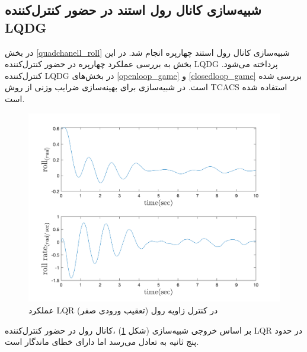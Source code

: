 \subsection{شبیه‌سازی کانال رول استند در حضور کنترل‌کننده LQDG}
در بخش
\ref{quadchanell_roll}
شبیه‌سازی کانال رول استند چهارپره انجام شد. در این بخش به بررسی عملکرد چهارپره در حضور کنترل‌کننده LQDG پرداخته می‌شود. کنترل‌کننده LQDG در بخش‌های
\ref{openloop_game}
و
\ref{closedloop_game}
بررسی شده است.
 در شبیه‌سازی برای بهینه‌سازی ضرایب وزنی از روش
TCACS \cite{Karimi2010}
استفاده شده است.
\begin{figure}[H]\label{lqr_roll_fig}
	\includegraphics[width=12cm]{../Figures/MIL/LQR/Roll/lqr_roll.png}
	\centering
	\caption{عملكرد LQR در کنترل زاويه رول (تعقیب ورودی صفر)}
\end{figure}
بر اساس خروجی شبیه‌سازی (شکل
\ref{lqr_roll_fig})
،کانال رول در حضور کنترل‌کننده LQR در حدود پنج ثانیه به تعادل می‌رسد اما دارای خطای ماندگار است. 